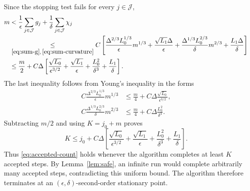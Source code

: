 Since the stopping test fails for every $j\in\mathcal J$,
\begin{align}
 m
 &<\frac1\epsilon\sum_{j\in\mathcal J}g_j
       +\frac1\delta\sum_{j\in\mathcal J}\chi_j\nonumber\\
 &\underset{\eqref{eq:sum-g},\,\eqref{eq:sum-curvature}}{\le}C\left[
 \frac{\Delta^{2/3}L_0^{1/3}}{\epsilon}m^{1/3}
 +\frac{\sqrt{L_1}\Delta}{\epsilon}
 +\frac{\Delta^{1/3}L_0^{2/3}}{\delta}m^{2/3}
 +\frac{L_1\Delta}{\delta}\right]\nonumber\\
 &\le\frac m2+C\Delta\left[
 \frac{\sqrt{L_0}}{\epsilon^{3/2}}
 +\frac{\sqrt{L_1}}{\epsilon}
 +\frac{L_0^2}{\delta^3}
 +\frac{L_1}{\delta}\right].
 \label{eq:accepted-absorption}
\end{align}
The last inequality follows from Young's inequality in the forms
\[
 \begin{aligned}
 C\frac{\Delta^{2/3}L_0^{1/3}}{\epsilon}m^{1/3}
 &\le\frac m4+C\Delta\frac{\sqrt{L_0}}{\epsilon^{3/2}},\\
 C\frac{\Delta^{1/3}L_0^{2/3}}{\delta}m^{2/3}
 &\le\frac m4+C\Delta\frac{L_0^2}{\delta^3}.
 \end{aligned}
\]
Subtracting $m/2$ and using $K=j_0+m$ proves
\begin{equation}\label{eq:accepted-count}
 K\le j_0+C\Delta\left[
 \frac{\sqrt{L_0}}{\epsilon^{3/2}}
 +\frac{\sqrt{L_1}}{\epsilon}
 +\frac{L_0^2}{\delta^3}
 +\frac{L_1}{\delta}\right].
\end{equation}
Thus \eqref{eq:accepted-count} holds whenever the algorithm completes at least
$K$ accepted steps. By Lemma~\ref{lem:safe}, an infinite run would complete
arbitrarily many accepted steps, contradicting this uniform bound.
The algorithm therefore terminates at an
$(\epsilon,\delta)$-second-order stationary point.

